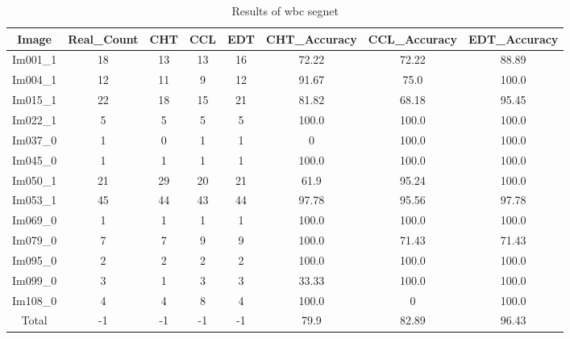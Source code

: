 \begin{table}[H]
\centering
\begin{tabular}{|c|c|c|c|c|c|c|c|}
\hline
 \textbf{Image} & \textbf{Real\_Count} & \textbf{CHT} & \textbf{CCL} & \textbf{EDT} & \textbf{CHT\_Accuracy} & \textbf{CCL\_Accuracy} & \textbf{EDT\_Accuracy} \\ \hline
 Im001\_1 & 18 & 13 & 13 & 16 & 72.22 & 72.22 & 88.89 \\ 
 Im004\_1 & 12 & 11 & 9 & 12 & 91.67 & 75.0 & 100.0 \\ 
 Im015\_1 & 22 & 18 & 15 & 21 & 81.82 & 68.18 & 95.45 \\ 
 Im022\_1 & 5 & 5 & 5 & 5 & 100.0 & 100.0 & 100.0 \\ 
 Im037\_0 & 1 & 0 & 1 & 1 & 0 & 100.0 & 100.0 \\ 
 Im045\_0 & 1 & 1 & 1 & 1 & 100.0 & 100.0 & 100.0 \\ 
 Im050\_1 & 21 & 29 & 20 & 21 & 61.9 & 95.24 & 100.0 \\ 
 Im053\_1 & 45 & 44 & 43 & 44 & 97.78 & 95.56 & 97.78 \\ 
 Im069\_0 & 1 & 1 & 1 & 1 & 100.0 & 100.0 & 100.0 \\ 
 Im079\_0 & 7 & 7 & 9 & 9 & 100.0 & 71.43 & 71.43 \\ 
 Im095\_0 & 2 & 2 & 2 & 2 & 100.0 & 100.0 & 100.0 \\ 
 Im099\_0 & 3 & 1 & 3 & 3 & 33.33 & 100.0 & 100.0 \\ 
 Im108\_0 & 4 & 4 & 8 & 4 & 100.0 & 0 & 100.0 \\ \hline
 Total & -1 & -1 & -1 & -1 & 79.9 & 82.89 & 96.43 \\ 

\hline
\end{tabular}
\caption{Results of wbc segnet}
\label{Results of wbc segnet}
\end{table}
